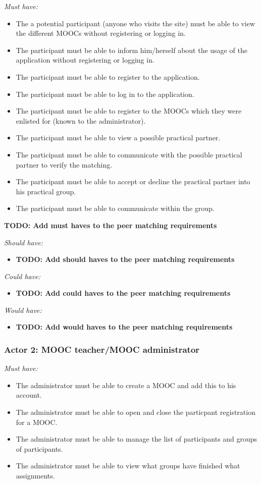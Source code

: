 \documentclass[]{article}
\newcommand{\TODO}[1]{{\color{red}\textbf{TODO: #1}}}
\newcommand{\reqr}[1]{{\noindent\emph{#1:}}}
\begin{document}
\reqr{Must have}
\begin{itemize}
\item The a potential participant (anyone who visits the site) must be able to view the different MOOCs without registering or logging in.
\item The participant must be able to inform him/herself about the usage of the application without registering or logging in.
\item The participant must be able to register to the application.
\item The participant must be able to log in to the application.
\item The participant must be able to register to the MOOCs which they were enlisted for (known to the administrator).
\item The participant must be able to view a possible practical partner.
\item The participant must be able to communicate with the possible practical partner to verify the matching.
\item The participant must be able to accept or decline the practical partner into his practical group.
\item The participant must be able to communicate within the group.
\end{itemize}
\TODO{Add must haves to the peer matching requirements}

\reqr{Should have}
\begin{itemize}
\item \TODO{Add should haves to the peer matching requirements}
\end{itemize}

\reqr{Could have}
\begin{itemize}
\item \TODO{Add could haves to the peer matching requirements}
\end{itemize}

\reqr{Would have}
\begin{itemize}
\item \TODO{Add would haves to the peer matching requirements}
\end{itemize}


\subsubsection{Actor 2: MOOC teacher/MOOC administrator}

\reqr{Must have}
\begin{itemize}
\item The administrator must be able to create a MOOC and add this to his account.
\item The administrator must be able to open and close the particpant registration for a MOOC.
\item The administrator must be able to manage the list of participants and groups of participants.
\item The administrator must be able to view what groups have finished what assignments.
\end{itemize}
\end{document}
